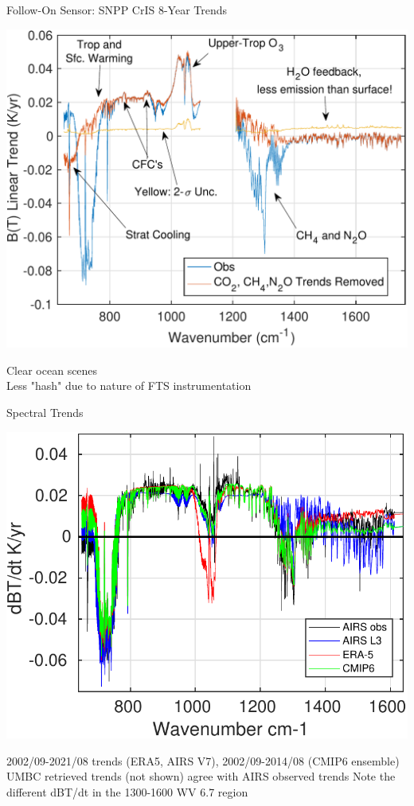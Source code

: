 \documentclass[10pt,t]{beamer}
\begin{document}
\begin{frame}{Follow-On Sensor: SNPP CrIS 8-Year Trends}
\begin{center}
\includegraphics[width=0.8\linewidth]{SunClimate2022/cris_dbt_clear_all_lats_lwmw_annotated.pdf}
\end{center}
\vspace{-0.1in}
\footnotesize Clear ocean scenes \\
\footnotesize Less "hash" due to nature of FTS instrumentation
\end{frame}

\begin{frame}{Spectral Trends}
\begin{center}
\includegraphics[width=0.75\linewidth]{NEWFIGS/model_vs_obs_BTtrends.pdf}
\end{center}
\footnotesize 2002/09-2021/08 trends (ERA5, AIRS V7), 2002/09-2014/08 (CMIP6 ensemble) \newline
\footnotesize UMBC retrieved trends (not shown) agree with AIRS observed trends \newline
\footnotesize Note the different dBT/dt in the 1300-1600 \wn WV 6.7 \um region
\end{frame}
\end{document}
